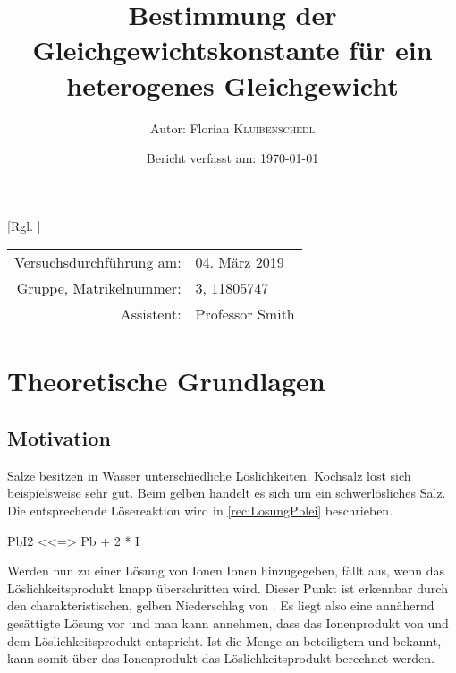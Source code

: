 \documentclass{article}
\title{Bestimmung der Gleichgewichtskonstante für ein heterogenes Gleichgewicht} %
\author{Autor: Florian \textsc{Kluibenschedl}} %
\date{Bericht verfasst am: \today} %
\begin{document}
  [Rgl. ]{}{}
  
  \maketitle %
  
  \begin{center}
    \begin{tabular}{r l}
      Versuchsdurchführung am: & 04. März 2019\\ %
      Gruppe, Matrikelnummer: & 3, 11805747 \\
      Assistent: & Professor Smith %
    \end{tabular}
  \end{center}


  \begin{abstract}
    
  \end{abstract}
  
  \section{Theoretische Grundlagen}
  
    \subsection{Motivation} \label{sec:Motivation}
    
      Salze besitzen in Wasser unterschiedliche Löslichkeiten. Kochsalz  löst sich beispielsweise sehr gut. Beim gelben  handelt es sich um ein schwerlösliches Salz. Die entsprechende Lösereaktion wird in \ref{rec:LosungPblei} beschrieben. 
           
      \begin{reaction}
        PbI2\sld{} <<=> Pb\pch[2]\aq{} +  2 * I\mch\aq{} \label{rec:LosungPblei}
      \end{reaction}
      
      Werden nun zu einer Lösung von  Ionen  Ionen hinzugegeben, fällt  aus, wenn das Löslichkeitsprodukt knapp überschritten wird. Dieser Punkt ist erkennbar durch den charakteristischen, gelben Niederschlag von . Es liegt also eine annähernd gesättigte Lösung vor und man kann annehmen, dass das Ionenprodukt von  und  dem Löslichkeitsprodukt entspricht. Ist die Menge an beteiligtem  und  bekannt, kann somit über das Ionenprodukt das Löslichkeitsprodukt berechnet werden.
      
\end{document}
